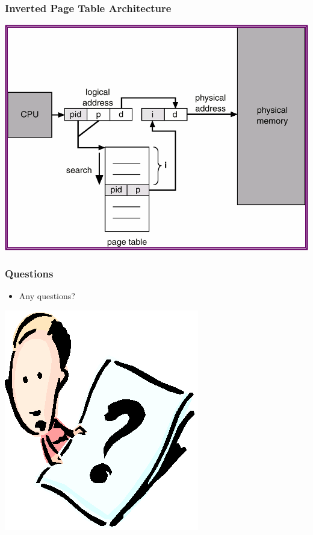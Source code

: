 \documentclass[CJKutf8,xcolor=pdftex,dvipsnames,table]{beamer}
\begin{document}
\begin{CJK*}{UTF8}{song}
  \begin{frame}
  \frametitle{Inverted Page Table Architecture} \pause
  \begin{center}
    \includegraphics[scale=.5]{v6f9-15}
  \end{center}
  \end{frame}
  
  \begin{frame}
  \frametitle{Questions}
  \begin{itemize}
  \item{Any questions?}
  \end{itemize}
  \begin{center}
    \includegraphics[scale=.5]{question}
  \end{center}
  \end{frame}
  

\end{CJK*}
\end{document}
